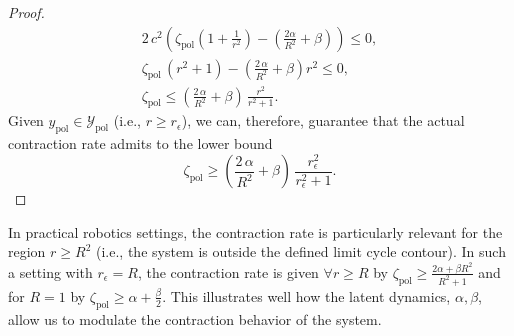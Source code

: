 \begin{proof}
    \begin{equation}
    \begin{split}
        2 \, c^2 \left ( \zeta_\mathrm{pol} \left ( 1 + \frac{1}{r^2} \right ) - \left ( \frac{2\alpha}{R^2}  + \beta\right ) \right ) \leq 0,\\
        \zeta_\mathrm{pol} \, \left ( r^2 + 1 \right ) - \left ( \frac{2 \, \alpha}{R^2} + \beta \right ) r^2 \leq 0,\\
        \zeta_\mathrm{pol}  \leq  \left ( \frac{2 \, \alpha}{R^2} + \beta \right ) \, \frac{r^2}{r^2 + 1}.
    \end{split}
    \end{equation}
    Given $y_\mathrm{pol} \in \mathcal{Y}_\mathrm{pol}$ (i.e., $r \geq r_\epsilon$), we can, therefore, guarantee that the actual contraction rate admits to the lower bound
    \begin{equation}
        \zeta_\mathrm{pol} \geq \left ( \frac{2 \, \alpha}{R^2} + \beta \right ) \, \frac{r_\epsilon^2}{r_\epsilon^2 + 1}.
    \end{equation}
\end{proof}
In practical robotics settings, the contraction rate is particularly relevant for the region $r \geq R^2$ (i.e., the system is outside the defined limit cycle contour). In such a setting with $r_\epsilon = R$, the contraction rate is given $\forall r \geq R$ by $\zeta_\mathrm{pol} \geq \frac{2 \alpha + \beta R^2}{R^2 + 1}$ and for $R = 1$ by $\zeta_\mathrm{pol} \geq \alpha + \frac{\beta}{2}$. This illustrates well how the latent dynamics, $\alpha, \beta$, allow us to modulate the contraction behavior of the system.

